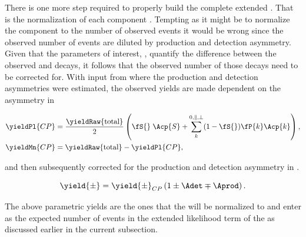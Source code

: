 There is one more step required to properly build the complete extended \pdf. That is the normalization of each component \pdf. Tempting as it might be to
normalize the component \pdfs to the number of observed events it would be wrong since the observed number of events are diluted by production and detection
asymmetry. Given that the parameters of interest, \ACP, quantify the difference between the observed \BsbarJpsiKst and \BsJpsiKst decays, it follows that
the observed  number of those decays need to be corrected for. With input from  where the production and detection
asymmetries were estimated, the observed yields are made dependent on the \ACP asymmetry in 

\begin{align}
\yieldPl{CP} &= \frac{ \yieldRaw{\text{total}} }{2} \left( \fS{}\; \Acp{S} + \sum_k^{0,\parallel,\perp} (1-\fS{})\fP{k}\Acp{k}  \right), \\
\yieldMn{CP} &=  \yieldRaw{\text{total}} - \yieldPl{CP},
\label{acp_yields}
\end{align}

\noindent and then subsequently corrected for the production and detection asymmetry in .

\begin{equation}
\yield{\pm} = \yield{\pm}_{CP}  \left( 1 \pm \Adet \mp \Aprod \right).
\label{norm_yields}
\end{equation}

\noindent The above parametric yields are the ones that the \pdfs will be normalized to and enter as the expected number of events in the extended
likelihood term of the \pdfs as discussed earlier in the current subsection.

